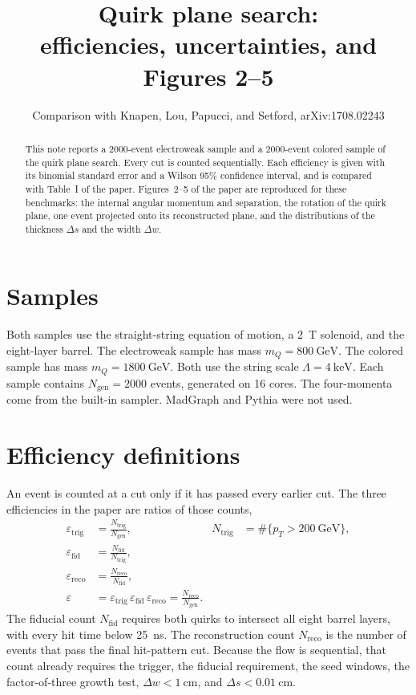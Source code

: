 \documentclass[11pt,a4paper]{article}
\title{Quirk plane search:\\ efficiencies, uncertainties, and Figures 2--5}
\author{Comparison with Knapen, Lou, Papucci, and Setford, arXiv:1708.02243}
\date{}
\begin{document}
\maketitle

\begin{abstract}
This note reports a 2000-event electroweak sample and a 2000-event colored sample of the quirk plane search.
Every cut is counted sequentially.
Each efficiency is given with its binomial standard error and a Wilson 95\% confidence interval, and is compared with Table~I of the paper.
Figures~2--5 of the paper are reproduced for these benchmarks: the internal angular momentum and separation, the rotation of the quirk plane, one event projected onto its reconstructed plane, and the distributions of the thickness \(\Delta s\) and the width \(\Delta w\).
\end{abstract}

\section{Samples}
Both samples use the straight-string equation of motion, a \SI{2}{\tesla} solenoid, and the eight-layer barrel.
The electroweak sample has mass \(m_Q = \SI{800}{\GeV}\).
The colored sample has mass \(m_Q = \SI{1800}{\GeV}\).
Both use the string scale \(\Lambda = \SI{4}{\keV}\).
Each sample contains \(N_{\mathrm{gen}} = 2000\) events, generated on 16 cores.
The four-momenta come from the built-in sampler.
MadGraph and Pythia were not used.

\section{Efficiency definitions}
An event is counted at a cut only if it has passed every earlier cut.
The three efficiencies in the paper are ratios of those counts,
\begin{align}
\varepsilon_{\mathrm{trig}}
  &= \frac{N_{\mathrm{trig}}}{N_{\mathrm{gen}}},
  &
  N_{\mathrm{trig}}
  &= \#\{p_T > \SI{200}{\GeV}\},
  \label{eq:trig}
  \\
\varepsilon_{\mathrm{fid}}
  &= \frac{N_{\mathrm{fid}}}{N_{\mathrm{trig}}},
  \label{eq:fid}
  \\
\varepsilon_{\mathrm{reco}}
  &= \frac{N_{\mathrm{reco}}}{N_{\mathrm{fid}}},
  \label{eq:reco}
  \\
\varepsilon
  &= \varepsilon_{\mathrm{trig}}\,
     \varepsilon_{\mathrm{fid}}\,
     \varepsilon_{\mathrm{reco}}
   = \frac{N_{\mathrm{reco}}}{N_{\mathrm{gen}}}.
  \label{eq:total}
\end{align}
The fiducial count \(N_{\mathrm{fid}}\) requires both quirks to intersect all eight barrel layers, with every hit time below \SI{25}{\ns}.
The reconstruction count \(N_{\mathrm{reco}}\) is the number of events that pass the final hit-pattern cut.
Because the flow is sequential, that count already requires the trigger, the fiducial requirement, the seed windows, the factor-of-three growth test, \(\Delta w < \SI{1}{\cm}\), and \(\Delta s < \SI{0.01}{\cm}\).
\end{document}
